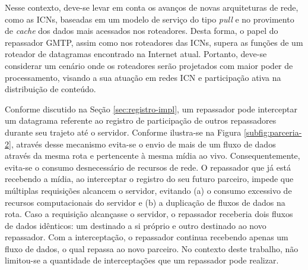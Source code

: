 Nesse contexto, deve-se levar em conta os avanços de novas arquiteturas de rede, como as ICNs,
baseadas em um modelo de serviço do tipo \textit{pull} e no provimento de \textit{cache} dos dados mais acessados nos roteadores.
Desta forma, o papel do repassador GMTP, assim como nos roteadores das ICNs, supera as funções de um roteador de datagramas encontrado na Internet atual. Portanto, deve-se considerar um cenário onde os roteadores serão projetados com maior poder de processamento, visando a sua atuação em redes ICN e participação ativa na distribuição de conteúdo.

Conforme discutido na Seção \ref{sec:registro-impl}, um repassador pode interceptar um datagrama referente ao registro de participação de outros repassadores durante seu trajeto até o servidor. 
Conforme ilustra-se na Figura \ref{subfig:parceria-2}, através desse mecanismo evita-se o envio de mais de um fluxo de dados através da mesma rota e pertencente à mesma mídia ao vivo. Consequentemente, evita-se o consumo desnecessário de recursos de rede.
O repassador que já está recebendo a mídia, ao interceptar o registro do seu futuro parceiro, impede que múltiplas requisições alcancem o servidor, evitando (a) o consumo excessivo de recursos computacionais do servidor e (b) a duplicação de fluxos de dados na rota.
Caso a requisição alcançasse o servidor, o repassador receberia dois fluxos de dados idênticos: um destinado a si próprio e outro destinado ao novo repassador. 
Com a interceptação, o repassador continua recebendo apenas um fluxo de dados, o qual repassa ao novo parceiro. No contexto deste trabalho, não limitou-se a quantidade de interceptações que um repassador pode realizar.


